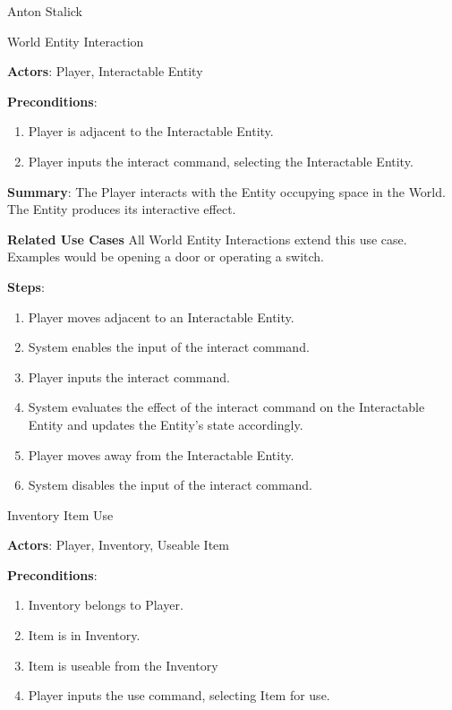 \documentclass[12pt]{report}
\begin{document}
\begin{section}{Anton Stalick}
\begin{subsection}{World Entity Interaction}

\textbf{Actors}:
Player, Interactable Entity

\textbf{Preconditions}:
\begin{enumerate}
\item Player is adjacent to the Interactable Entity.
\item Player inputs the interact command, selecting the Interactable Entity.
\end{enumerate}

\textbf{Summary}:
The Player interacts with the Entity occupying space in the World. The Entity 
produces its interactive effect. 

\textbf{Related Use Cases}
All World Entity Interactions extend this use case. Examples would be 
opening a door or operating a switch.

\textbf{Steps}:
\begin{enumerate}
\item Player moves adjacent to an Interactable Entity.
\item System enables the input of the interact command.
\item Player inputs the interact command.
\item System evaluates the effect of the interact command on the
Interactable Entity and updates the Entity's state accordingly.
\item Player moves away from the Interactable Entity.
\item System disables the input of the interact command.
\end{enumerate}

\end{subsection}

\begin{subsection}{Inventory Item Use}

\textbf{Actors}:
Player, Inventory, Useable Item

\textbf{Preconditions}:
\begin{enumerate}
\item Inventory belongs to Player.
\item Item is in Inventory.
\item Item is useable from the Inventory
\item Player inputs the use command, selecting Item for use.
\end{enumerate}


\end{subsection}
\end{section}
\end{document}
